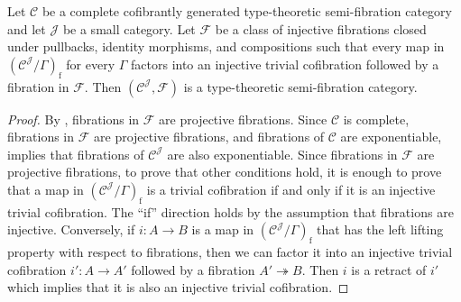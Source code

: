 \documentclass[reqno]{amsart}
\theoremstyle{definition}
\theoremstyle{remark}
\newcommand{\fs}[1]{\mathrm{#1}}
\newcommand{\scat}[1]{\mathcal{#1}}
\newcommand{\Fib}{\mathcal{F}}
\numberwithin{figure}{section}
\begin{document}
\begin{prop}[injective]
Let $\scat{C}$ be a complete cofibrantly generated type-theoretic semi-fibration category and let $\scat{J}$ be a small category.
Let $\Fib$ be a class of injective fibrations closed under pullbacks, identity morphisms, and compositions such that every map in $(\scat{C}^\scat{J}/\Gamma)_\fs{f}$ for every $\Gamma$ factors into an injective trivial cofibration followed by a fibration in $\Fib$.
Then $(\scat{C}^\scat{J},\Fib)$ is a type-theoretic semi-fibration category.
\end{prop}
\begin{proof}
By , fibrations in $\Fib$ are projective fibrations.
Since $\scat{C}$ is complete, fibrations in $\Fib$ are projective fibrations, and fibrations of $\scat{C}$ are exponentiable, \cite[Theorem~2.12]{comp-fact-tor} implies that fibrations of $\scat{C}^\scat{J}$ are also exponentiable.
Since fibrations in $\Fib$ are projective fibrations, to prove that other conditions hold, it is enough to prove that a map in $(\scat{C}^\scat{J}/\Gamma)_\fs{f}$ is a trivial cofibration if and only if it is an injective trivial cofibration.
The ``if'' direction holds by the assumption that fibrations are injective.
Conversely, if $i : A \to B$ is a map in $(\scat{C}^\scat{J}/\Gamma)_\fs{f}$ that has the left lifting property with respect to fibrations, then we can factor it into an injective trivial cofibration $i' : A \to A'$ followed by a fibration $A' \twoheadrightarrow B$.
Then $i$ is a retract of $i'$ which implies that it is also an injective trivial cofibration.
\end{proof}
\end{document}
